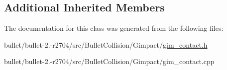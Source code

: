 \subsection*{Additional Inherited Members}


The documentation for this class was generated from the following files\+:\begin{DoxyCompactItemize}
\item 
bullet/bullet-\/2.-\/r2704/src/\+Bullet\+Collision/\+Gimpact/\hyperlink{gim__contact_8h}{gim\+\_\+contact.\+h}\item 
bullet/bullet-\/2.-\/r2704/src/\+Bullet\+Collision/\+Gimpact/gim\+\_\+contact.\+cpp\end{DoxyCompactItemize}
